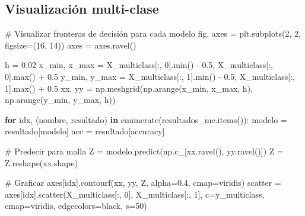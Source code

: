 \documentclass[
  doc,
  floatsintext,
  longtable,
  a4paper,
  nolmodern,
  notxfonts,
  notimes,
  12pt,
  colorlinks=true,linkcolor=blue,citecolor=blue,urlcolor=blue]{apa7}
\newenvironment{Shaded}{\begin{snugshade}}{\end{snugshade}}
\newcommand{\BuiltInTok}[1]{\textcolor[rgb]{0.00,0.23,0.31}{#1}}
\newcommand{\CommentTok}[1]{\textcolor[rgb]{0.37,0.37,0.37}{#1}}
\newcommand{\ControlFlowTok}[1]{\textcolor[rgb]{0.00,0.23,0.31}{\textbf{#1}}}
\newcommand{\DecValTok}[1]{\textcolor[rgb]{0.68,0.00,0.00}{#1}}
\newcommand{\FloatTok}[1]{\textcolor[rgb]{0.68,0.00,0.00}{#1}}
\newcommand{\KeywordTok}[1]{\textcolor[rgb]{0.00,0.23,0.31}{\textbf{#1}}}
\newcommand{\NormalTok}[1]{\textcolor[rgb]{0.00,0.23,0.31}{#1}}
\newcommand{\OperatorTok}[1]{\textcolor[rgb]{0.37,0.37,0.37}{#1}}
\newcommand{\StringTok}[1]{\textcolor[rgb]{0.13,0.47,0.30}{#1}}
\begin{document}
\subsection{Visualización
multi-clase}\label{visualizaciuxf3n-multi-clase}

\begin{Shaded}
\begin{Highlighting}[]
\CommentTok{\# Visualizar fronteras de decisión para cada modelo}
\NormalTok{fig, axes }\OperatorTok{=}\NormalTok{ plt.subplots(}\DecValTok{2}\NormalTok{, }\DecValTok{2}\NormalTok{, figsize}\OperatorTok{=}\NormalTok{(}\DecValTok{16}\NormalTok{, }\DecValTok{14}\NormalTok{))}
\NormalTok{axes }\OperatorTok{=}\NormalTok{ axes.ravel()}

\NormalTok{h }\OperatorTok{=} \FloatTok{0.02}
\NormalTok{x\_min, x\_max }\OperatorTok{=}\NormalTok{ X\_multiclass[:, }\DecValTok{0}\NormalTok{].}\BuiltInTok{min}\NormalTok{() }\OperatorTok{{-}} \FloatTok{0.5}\NormalTok{, X\_multiclass[:, }\DecValTok{0}\NormalTok{].}\BuiltInTok{max}\NormalTok{() }\OperatorTok{+} \FloatTok{0.5}
\NormalTok{y\_min, y\_max }\OperatorTok{=}\NormalTok{ X\_multiclass[:, }\DecValTok{1}\NormalTok{].}\BuiltInTok{min}\NormalTok{() }\OperatorTok{{-}} \FloatTok{0.5}\NormalTok{, X\_multiclass[:, }\DecValTok{1}\NormalTok{].}\BuiltInTok{max}\NormalTok{() }\OperatorTok{+} \FloatTok{0.5}
\NormalTok{xx, yy }\OperatorTok{=}\NormalTok{ np.meshgrid(np.arange(x\_min, x\_max, h),}
\NormalTok{                     np.arange(y\_min, y\_max, h))}

\ControlFlowTok{for}\NormalTok{ idx, (nombre, resultado) }\KeywordTok{in} \BuiltInTok{enumerate}\NormalTok{(resultados\_mc.items()):}
\NormalTok{    modelo }\OperatorTok{=}\NormalTok{ resultado[}\StringTok{\textquotesingle{}modelo\textquotesingle{}}\NormalTok{]}
\NormalTok{    acc }\OperatorTok{=}\NormalTok{ resultado[}\StringTok{\textquotesingle{}accuracy\textquotesingle{}}\NormalTok{]}
    
    \CommentTok{\# Predecir para malla}
\NormalTok{    Z }\OperatorTok{=}\NormalTok{ modelo.predict(np.c\_[xx.ravel(), yy.ravel()])}
\NormalTok{    Z }\OperatorTok{=}\NormalTok{ Z.reshape(xx.shape)}
    
    \CommentTok{\# Graficar}
\NormalTok{    axes[idx].contourf(xx, yy, Z, alpha}\OperatorTok{=}\FloatTok{0.4}\NormalTok{, cmap}\OperatorTok{=}\StringTok{\textquotesingle{}viridis\textquotesingle{}}\NormalTok{)}
\NormalTok{    scatter }\OperatorTok{=}\NormalTok{ axes[idx].scatter(X\_multiclass[:, }\DecValTok{0}\NormalTok{], X\_multiclass[:, }\DecValTok{1}\NormalTok{],}
\NormalTok{                               c}\OperatorTok{=}\NormalTok{y\_multiclass, cmap}\OperatorTok{=}\StringTok{\textquotesingle{}viridis\textquotesingle{}}\NormalTok{,}
\NormalTok{                               edgecolors}\OperatorTok{=}\StringTok{\textquotesingle{}black\textquotesingle{}}\NormalTok{, s}\OperatorTok{=}\DecValTok{50}\NormalTok{)}
    

\end{Highlighting}
\end{Shaded}
\end{document}
